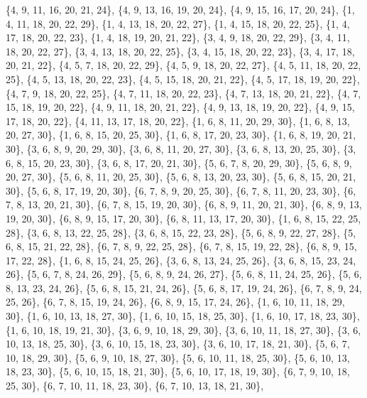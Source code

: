 \documentclass[11pt,a4paper]{article}
\begin{document}
{\{4, 9, 11, 16, 20, 21, 24\}, \{4, 9, 13, 16, 19, 20, 24\}, \{4, 9, 15, 16, 17, 20, 24\}, \{1, 4, 11, 18, 20, 22, 29\}, \{1, 4, 13, 18, 20, 22, 27\},
\{1, 4, 15, 18, 20, 22, 25\}, \{1, 4, 17, 18, 20, 22, 23\}, \{1, 4, 18, 19, 20, 21, 22\}, \{3, 4, 9, 18, 20, 22, 29\}, \{3, 4, 11, 18, 20, 22, 27\},
\{3, 4, 13, 18, 20, 22, 25\}, \{3, 4, 15, 18, 20, 22, 23\}, \{3, 4, 17, 18, 20, 21, 22\}, \{4, 5, 7, 18, 20, 22, 29\}, \{4, 5, 9, 18, 20, 22, 27\},
\{4, 5, 11, 18, 20, 22, 25\}, \{4, 5, 13, 18, 20, 22, 23\}, \{4, 5, 15, 18, 20, 21, 22\}, \{4, 5, 17, 18, 19, 20, 22\}, \{4, 7, 9, 18, 20, 22, 25\},
\{4, 7, 11, 18, 20, 22, 23\}, \{4, 7, 13, 18, 20, 21, 22\}, \{4, 7, 15, 18, 19, 20, 22\}, \{4, 9, 11, 18, 20, 21, 22\}, \{4, 9, 13, 18, 19, 20, 22\},
\{4, 9, 15, 17, 18, 20, 22\}, \{4, 11, 13, 17, 18, 20, 22\}, \{1, 6, 8, 11, 20, 29, 30\}, \{1, 6, 8, 13, 20, 27, 30\}, \{1, 6, 8, 15, 20, 25, 30\},
\{1, 6, 8, 17, 20, 23, 30\}, \{1, 6, 8, 19, 20, 21, 30\}, \{3, 6, 8, 9, 20, 29, 30\}, \{3, 6, 8, 11, 20, 27, 30\}, \{3, 6, 8, 13, 20, 25, 30\},
\{3, 6, 8, 15, 20, 23, 30\}, \{3, 6, 8, 17, 20, 21, 30\}, \{5, 6, 7, 8, 20, 29, 30\}, \{5, 6, 8, 9, 20, 27, 30\}, \{5, 6, 8, 11, 20, 25, 30\},
\{5, 6, 8, 13, 20, 23, 30\}, \{5, 6, 8, 15, 20, 21, 30\}, \{5, 6, 8, 17, 19, 20, 30\}, \{6, 7, 8, 9, 20, 25, 30\}, \{6, 7, 8, 11, 20, 23, 30\},
\{6, 7, 8, 13, 20, 21, 30\}, \{6, 7, 8, 15, 19, 20, 30\}, \{6, 8, 9, 11, 20, 21, 30\}, \{6, 8, 9, 13, 19, 20, 30\}, \{6, 8, 9, 15, 17, 20, 30\},
\{6, 8, 11, 13, 17, 20, 30\}, \{1, 6, 8, 15, 22, 25, 28\}, \{3, 6, 8, 13, 22, 25, 28\}, \{3, 6, 8, 15, 22, 23, 28\}, \{5, 6, 8, 9, 22, 27, 28\},
\{5, 6, 8, 15, 21, 22, 28\}, \{6, 7, 8, 9, 22, 25, 28\}, \{6, 7, 8, 15, 19, 22, 28\}, \{6, 8, 9, 15, 17, 22, 28\}, \{1, 6, 8, 15, 24, 25, 26\},
\{3, 6, 8, 13, 24, 25, 26\}, \{3, 6, 8, 15, 23, 24, 26\}, \{5, 6, 7, 8, 24, 26, 29\}, \{5, 6, 8, 9, 24, 26, 27\}, \{5, 6, 8, 11, 24, 25, 26\},
\{5, 6, 8, 13, 23, 24, 26\}, \{5, 6, 8, 15, 21, 24, 26\}, \{5, 6, 8, 17, 19, 24, 26\}, \{6, 7, 8, 9, 24, 25, 26\}, \{6, 7, 8, 15, 19, 24, 26\},
\{6, 8, 9, 15, 17, 24, 26\}, \{1, 6, 10, 11, 18, 29, 30\}, \{1, 6, 10, 13, 18, 27, 30\}, \{1, 6, 10, 15, 18, 25, 30\}, \{1, 6, 10, 17, 18, 23, 30\},
\{1, 6, 10, 18, 19, 21, 30\}, \{3, 6, 9, 10, 18, 29, 30\}, \{3, 6, 10, 11, 18, 27, 30\}, \{3, 6, 10, 13, 18, 25, 30\}, \{3, 6, 10, 15, 18, 23, 30\},
\{3, 6, 10, 17, 18, 21, 30\}, \{5, 6, 7, 10, 18, 29, 30\}, \{5, 6, 9, 10, 18, 27, 30\}, \{5, 6, 10, 11, 18, 25, 30\}, \{5, 6, 10, 13, 18, 23, 30\},
\{5, 6, 10, 15, 18, 21, 30\}, \{5, 6, 10, 17, 18, 19, 30\}, \{6, 7, 9, 10, 18, 25, 30\}, \{6, 7, 10, 11, 18, 23, 30\}, \{6, 7, 10, 13, 18, 21, 30\},
}
\end{document}
